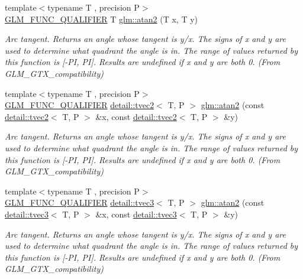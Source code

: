 \begin{DoxyCompactItemize}
{\footnotesize template$<$typename T , precision P$>$ }\\\hyperlink{setup_8hpp_a33fdea6f91c5f834105f7415e2a64407}{G\+L\+M\+\_\+\+F\+U\+N\+C\+\_\+\+Q\+U\+A\+L\+I\+F\+I\+ER} T \hyperlink{group__gtx__compatibility_gac63011205bf6d0be82589dc56dd26708}{glm\+::atan2} (T x, T y)
\begin{DoxyCompactList}\small\item\em Arc tangent. Returns an angle whose tangent is y/x. The signs of x and y are used to determine what quadrant the angle is in. The range of values returned by this function is \mbox{[}-\/\+PI, PI\mbox{]}. Results are undefined if x and y are both 0. (From G\+L\+M\+\_\+\+G\+T\+X\+\_\+compatibility) \end{DoxyCompactList}\item 
{\footnotesize template$<$typename T , precision P$>$ }\\\hyperlink{setup_8hpp_a33fdea6f91c5f834105f7415e2a64407}{G\+L\+M\+\_\+\+F\+U\+N\+C\+\_\+\+Q\+U\+A\+L\+I\+F\+I\+ER} \hyperlink{structglm_1_1detail_1_1tvec2}{detail\+::tvec2}$<$ T, P $>$ \hyperlink{group__gtx__compatibility_ga9947ea1e628e2823b9276924445e0147}{glm\+::atan2} (const \hyperlink{structglm_1_1detail_1_1tvec2}{detail\+::tvec2}$<$ T, P $>$ \&x, const \hyperlink{structglm_1_1detail_1_1tvec2}{detail\+::tvec2}$<$ T, P $>$ \&y)
\begin{DoxyCompactList}\small\item\em Arc tangent. Returns an angle whose tangent is y/x. The signs of x and y are used to determine what quadrant the angle is in. The range of values returned by this function is \mbox{[}-\/\+PI, PI\mbox{]}. Results are undefined if x and y are both 0. (From G\+L\+M\+\_\+\+G\+T\+X\+\_\+compatibility) \end{DoxyCompactList}\item 
{\footnotesize template$<$typename T , precision P$>$ }\\\hyperlink{setup_8hpp_a33fdea6f91c5f834105f7415e2a64407}{G\+L\+M\+\_\+\+F\+U\+N\+C\+\_\+\+Q\+U\+A\+L\+I\+F\+I\+ER} \hyperlink{structglm_1_1detail_1_1tvec3}{detail\+::tvec3}$<$ T, P $>$ \hyperlink{group__gtx__compatibility_gac457f8819be9cd8e3f42be17451b750a}{glm\+::atan2} (const \hyperlink{structglm_1_1detail_1_1tvec3}{detail\+::tvec3}$<$ T, P $>$ \&x, const \hyperlink{structglm_1_1detail_1_1tvec3}{detail\+::tvec3}$<$ T, P $>$ \&y)
\begin{DoxyCompactList}\small\item\em Arc tangent. Returns an angle whose tangent is y/x. The signs of x and y are used to determine what quadrant the angle is in. The range of values returned by this function is \mbox{[}-\/\+PI, PI\mbox{]}. Results are undefined if x and y are both 0. (From G\+L\+M\+\_\+\+G\+T\+X\+\_\+compatibility) \end{DoxyCompactList}\item 

\end{DoxyCompactItemize}
